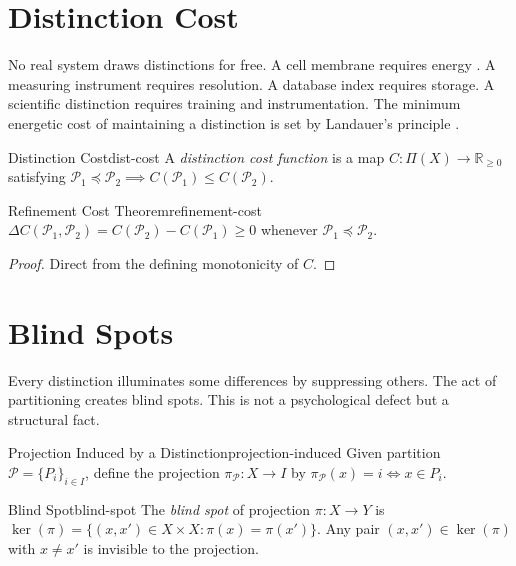 \documentclass[12pt,twoside,openright]{book}
\newcommand{\partition}{\mathcal{P}}
\begin{document}
\section{Distinction Cost}
\label{sec:ch1-cost}

No real system draws distinctions for free. A cell
membrane requires energy \parencite{schrodinger1944}.
A measuring instrument requires resolution.
A database index requires storage.
A scientific distinction requires training and
instrumentation. The minimum energetic cost of
maintaining a distinction is set by Landauer's principle
\parencite{landauer1961irreversibility}.

\begin{definition}{Distinction Cost}{dist-cost}
  A \emph{distinction cost function} is a map
  $C: \Pi(X) \to \mathbb{R}_{\ge 0}$ satisfying
  $\partition_1 \preceq \partition_2 \implies
  C(\partition_1) \le C(\partition_2)$.
\end{definition}

\begin{theorem}{Refinement Cost Theorem}{refinement-cost}
  $\Delta C(\partition_1, \partition_2)
  = C(\partition_2) - C(\partition_1) \ge 0$
  whenever $\partition_1 \preceq \partition_2$.
\end{theorem}

\begin{proof}
  Direct from the defining monotonicity of $C$.
\end{proof}

\section{Blind Spots}
\label{sec:ch1-blind}

Every distinction illuminates some differences by
suppressing others. The act of partitioning creates blind
spots. This is not a psychological defect but a
structural fact.

\begin{definition}{Projection Induced by a Distinction}{projection-induced}
  Given partition $\partition = \{P_i\}_{i \in I}$,
  define the projection $\pi_\partition: X \to I$ by
  $\pi_\partition(x) = i \iff x \in P_i$.
\end{definition}

\begin{definition}{Blind Spot}{blind-spot}
  The \emph{blind spot} of projection $\pi: X \to Y$ is
  $\ker(\pi) = \{(x,x') \in X \times X : \pi(x) = \pi(x')\}$.
  Any pair $(x,x') \in \ker(\pi)$ with $x \ne x'$ is
  invisible to the projection.
\end{definition}
\end{document}
